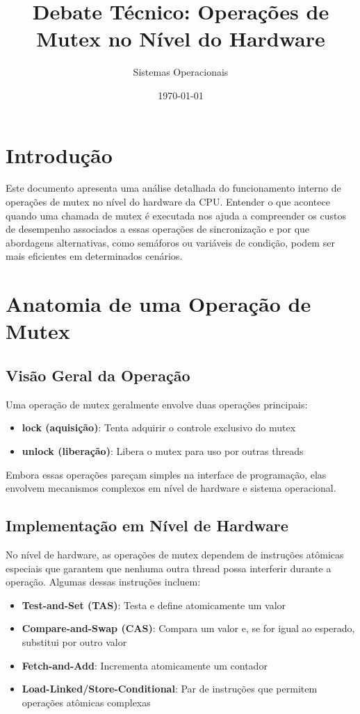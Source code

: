 \documentclass[12pt]{article}
\title{Debate Técnico: Operações de Mutex no Nível do Hardware}
\author{Sistemas Operacionais}
\date{\today}
\begin{document}
\maketitle

\section{Introdução}

Este documento apresenta uma análise detalhada do funcionamento interno de operações de mutex no nível do hardware da CPU. Entender o que acontece quando uma chamada de mutex é executada nos ajuda a compreender os custos de desempenho associados a essas operações de sincronização e por que abordagens alternativas, como semáforos ou variáveis de condição, podem ser mais eficientes em determinados cenários.

\section{Anatomia de uma Operação de Mutex}

\subsection{Visão Geral da Operação}

Uma operação de mutex geralmente envolve duas operações principais:
\begin{itemize}
    \item \textbf{lock (aquisição)}: Tenta adquirir o controle exclusivo do mutex
    \item \textbf{unlock (liberação)}: Libera o mutex para uso por outras threads
\end{itemize}

Embora essas operações pareçam simples na interface de programação, elas envolvem mecanismos complexos em nível de hardware e sistema operacional.

\subsection{Implementação em Nível de Hardware}

No nível de hardware, as operações de mutex dependem de instruções atômicas especiais que garantem que nenhuma outra thread possa interferir durante a operação. Algumas dessas instruções incluem:

\begin{itemize}
    \item \textbf{Test-and-Set (TAS)}: Testa e define atomicamente um valor
    \item \textbf{Compare-and-Swap (CAS)}: Compara um valor e, se for igual ao esperado, substitui por outro valor
    \item \textbf{Fetch-and-Add}: Incrementa atomicamente um contador
    \item \textbf{Load-Linked/Store-Conditional}: Par de instruções que permitem operações atômicas complexas
\end{itemize}
\end{document}
